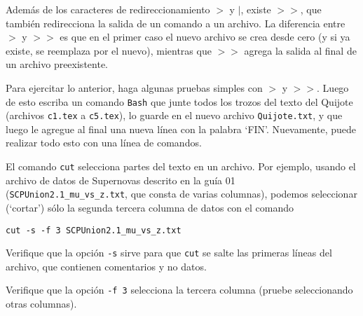 \documentclass[11pt]{exam}
\begin{document}
\begin{questions}
\item Además de los caracteres de redireccionamiento $>$ y $\vert$, existe $>>$, que también redirecciona la salida de un comando a un archivo. La diferencia entre $>$ y $>>$ es que en el primer caso el nuevo archivo se crea desde cero (y si ya existe, se reemplaza por el nuevo), mientras que $>>$ agrega la salida al final de un archivo preexistente.

Para ejercitar lo anterior, haga algunas pruebas simples con $>$ y $>>$. Luego de esto escriba un comando \texttt{Bash} que junte todos los trozos del texto del Quijote (archivos \texttt{c1.tex} a \texttt{c5.tex}), lo guarde en el nuevo archivo \texttt{Quijote.txt},   y que luego le agregue al final una nueva línea con la palabra `FIN'. Nuevamente, puede realizar todo esto con una línea de comandos.

\item El comando \texttt{cut} selecciona partes del texto en un archivo. Por ejemplo, usando el archivo de datos de Supernovas descrito en la guía 01 (\texttt{SCPUnion2.1\_mu\_vs\_z.txt}, que consta de varias columnas), podemos seleccionar (`cortar') sólo la segunda tercera columna de datos con el comando
\begin{verbatim}
cut -s -f 3 SCPUnion2.1_mu_vs_z.txt
\end{verbatim}
\begin{parts}
\item Verifique que la opción \texttt{-s} sirve para que \texttt{cut} se salte las primeras líneas del archivo, que contienen comentarios y no datos.
\item Verifique que la opción \texttt{-f 3} selecciona la tercera columna (pruebe seleccionando otras columnas).
\end{parts}
\end{questions}
\end{document}
